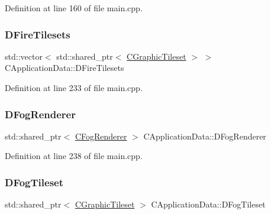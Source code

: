 Definition at line 160 of file main.\+cpp.

\hypertarget{classCApplicationData_a68f7be36ab8b46ea7fca3bd3e79784cd}{}\label{classCApplicationData_a68f7be36ab8b46ea7fca3bd3e79784cd} 
\subsubsection{\texorpdfstring{D\+Fire\+Tilesets}{DFireTilesets}}
{\footnotesize\ttfamily std\+::vector$<$ std\+::shared\+\_\+ptr$<$ \hyperlink{classCGraphicTileset}{C\+Graphic\+Tileset} $>$ $>$ C\+Application\+Data\+::\+D\+Fire\+Tilesets\hspace{0.3cm}{\ttfamily [protected]}}



Definition at line 233 of file main.\+cpp.

\hypertarget{classCApplicationData_ad825b9b196c31f92700541e1332009cc}{}\label{classCApplicationData_ad825b9b196c31f92700541e1332009cc} 
\subsubsection{\texorpdfstring{D\+Fog\+Renderer}{DFogRenderer}}
{\footnotesize\ttfamily std\+::shared\+\_\+ptr$<$ \hyperlink{classCFogRenderer}{C\+Fog\+Renderer} $>$ C\+Application\+Data\+::\+D\+Fog\+Renderer\hspace{0.3cm}{\ttfamily [protected]}}



Definition at line 238 of file main.\+cpp.

\hypertarget{classCApplicationData_a9d9103087da6592c08b8d6c669665323}{}\label{classCApplicationData_a9d9103087da6592c08b8d6c669665323} 
\subsubsection{\texorpdfstring{D\+Fog\+Tileset}{DFogTileset}}
{\footnotesize\ttfamily std\+::shared\+\_\+ptr$<$ \hyperlink{classCGraphicTileset}{C\+Graphic\+Tileset} $>$ C\+Application\+Data\+::\+D\+Fog\+Tileset\hspace{0.3cm}{\ttfamily [protected]}}




